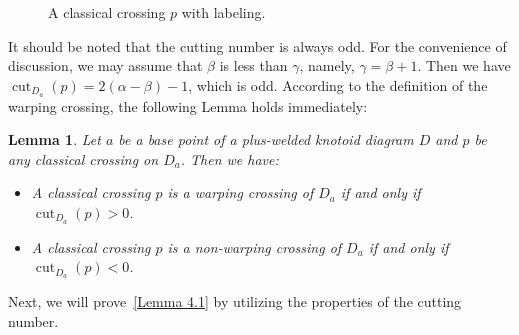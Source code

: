 \documentclass[11pt]{amsart}
\theoremstyle{noparens}
\newtheorem{lemma}{Lemma}[section]
\numberwithin{equation}{section}
\numberwithin{equation}{section}
\begin{document}
\begin{figure}[htbp]
\begin{center}
\caption{A classical crossing $p$ with labeling.}
\label{Figure 18}
\end{center}
\end{figure}
It should be noted that the cutting number is always odd. For the convenience of discussion, we may assume that $\beta$ is less than $\gamma$, namely, $\gamma=\beta + 1$. Then we have
$\operatorname{cut}_{D_a}(p)=2(\alpha-\beta)- 1$, which is odd. According to the definition of the warping crossing, the following Lemma holds immediately:

\begin{lemma} \label{Lemma 4.2}
Let $a$ be a base point of a plus-welded knotoid diagram $D$ and $p$ be any classical crossing on $D_a$. Then we have: 
\begin{itemize}	
\item[(1)] A classical crossing $p$ is a warping crossing of $D_a$ if and only if $\operatorname{cut}_{D_a}(p)> 0$. 
\item[(2)] A classical crossing $p$ is a non-warping crossing of $D_a$ if and only if $\operatorname{cut}_{D_a}(p)< 0$.
\end{itemize}
\end{lemma} 

Next, we will prove~\cref{Lemma 4.1} by utilizing the properties of the cutting number. 
\end{document}
